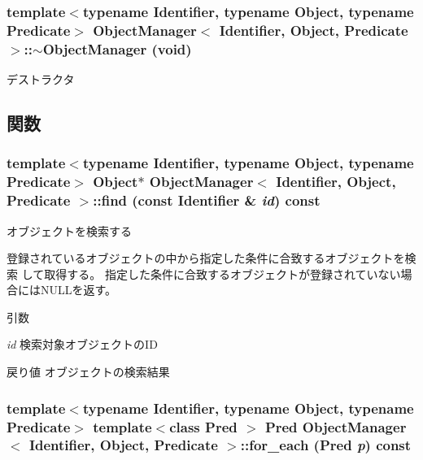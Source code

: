 \subsubsection[{$\sim$ObjectManager}]{\setlength{\rightskip}{0pt plus 5cm}template$<$typename Identifier, typename Object, typename Predicate$>$ {\bf ObjectManager}$<$ Identifier, Object, Predicate $>$::$\sim${\bf ObjectManager} (void)\hspace{0.3cm}{\ttfamily  [inline]}}\label{classObjectManager_a38ef0a5005c4a54bda07e0fa1755566a}
デストラクタ 

\subsection{関数}
\subsubsection[{find}]{\setlength{\rightskip}{0pt plus 5cm}template$<$typename Identifier, typename Object, typename Predicate$>$ Object$\ast$ {\bf ObjectManager}$<$ Identifier, Object, Predicate $>$::find (const Identifier \& {\em id}) const\hspace{0.3cm}{\ttfamily  [inline]}}\label{classObjectManager_a3f4cd060f97d7c74bc91d23e42df50de}


オブジェクトを検索する 

登録されているオブジェクトの中から指定した条件に合致するオブジェクトを検索 して取得する。 指定した条件に合致するオブジェクトが登録されていない場合にはNULLを返す。


\begin{DoxyParams}{引数}
\item[{\em id}]検索対象オブジェクトのID\end{DoxyParams}
\begin{DoxyReturn}{戻り値}
オブジェクトの検索結果 
\end{DoxyReturn}
\subsubsection[{for\_\-each}]{\setlength{\rightskip}{0pt plus 5cm}template$<$typename Identifier, typename Object, typename Predicate$>$ template$<$class Pred $>$ Pred {\bf ObjectManager}$<$ Identifier, Object, Predicate $>$::for\_\-each (Pred {\em p}) const\hspace{0.3cm}{\ttfamily  [inline]}}\label{classObjectManager_a84fa687e172f25f6facb497396683bb4}


